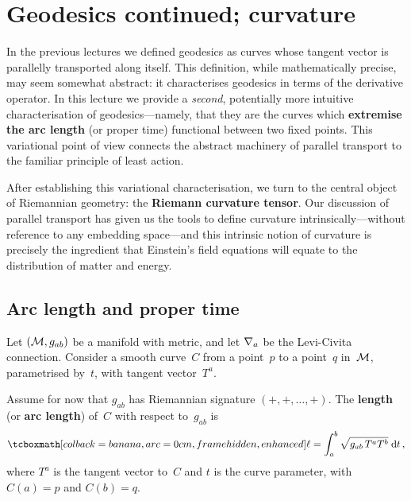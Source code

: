 
\section{Geodesics continued; curvature}\label{sec:geodesics-curvature}

In the previous lectures we defined geodesics as curves whose
tangent vector is parallelly transported along itself.  This
definition, while mathematically precise, may seem somewhat
abstract: it characterises geodesics in terms of the derivative
operator.  In this lecture we provide a \emph{second},
potentially more intuitive characterisation of geodesics---namely,
that they are the curves which \textbf{extremise the arc length}
(or proper time) functional between two fixed points.  This
variational point of view connects the abstract machinery of
parallel transport to the familiar principle of least action.

After establishing this variational characterisation, we turn to
the central object of Riemannian geometry: the \textbf{Riemann
curvature tensor}.  Our discussion of parallel transport has
given us the tools to define curvature intrinsically---without
reference to any embedding space---and this intrinsic notion of
curvature is precisely the ingredient that Einstein's field
equations will equate to the distribution of matter and energy.

\subsection{Arc length and proper time}\label{sec:arc-length}

Let $(\mathcal{M},g_{ab})$ be a manifold with metric, and let $\nabla_a$
be the Levi-Civita connection.  Consider a smooth curve~$C$
from a point~$p$ to a point~$q$ in~$\mathcal{M}$, parametrised by~$t$,
with tangent vector~$T^a$.



\begin{definition}\label{def:arc-length}
  Assume for now that $g_{ab}$ has Riemannian signature
  $(+,+,\dots,+)$.  The \textbf{length} (or \textbf{arc length})
  of~$C$ with respect to~$g_{ab}$ is
  \begin{equation}\label{eq:arc-length}
    \eqbox{\ell = \int_a^b \sqrt{g_{ab}\,T^a T^b}\;\dd t}\,,
  \end{equation}
  where $T^a$ is the tangent vector to~$C$ and $t$ is the curve
  parameter, with $C(a)=p$ and $C(b)=q$.
\end{definition}

